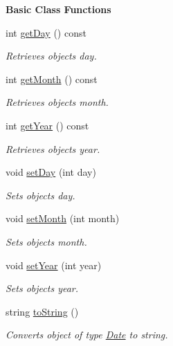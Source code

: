 \begin{Indent}\textbf{ Basic Class Functions}\par
\begin{DoxyCompactItemize}
\item 
int \hyperlink{group___date_ga0f253815240e70f4c39cb93cc68bd3f4}{get\+Day} () const
\begin{DoxyCompactList}\small\item\em Retrieves object\textquotesingle{}s day. \end{DoxyCompactList}\item 
int \hyperlink{group___date_ga332f6e3a2f6a40d73742b6dab7be0f64}{get\+Month} () const
\begin{DoxyCompactList}\small\item\em Retrieves object\textquotesingle{}s month. \end{DoxyCompactList}\item 
int \hyperlink{group___date_ga8b0869f34c2b38d108ab83ee2e770e5d}{get\+Year} () const
\begin{DoxyCompactList}\small\item\em Retrieves object\textquotesingle{}s year. \end{DoxyCompactList}\item 
void \hyperlink{group___date_ga2f97b9d1ac5ef0ef6b6cab3335c5303d}{set\+Day} (int day)
\begin{DoxyCompactList}\small\item\em Sets object\textquotesingle{}s day. \end{DoxyCompactList}\item 
void \hyperlink{group___date_ga23aa56014dd581d691607df5d4474f64}{set\+Month} (int month)
\begin{DoxyCompactList}\small\item\em Sets object\textquotesingle{}s month. \end{DoxyCompactList}\item 
void \hyperlink{group___date_ga895c4ae9868e43577cf59d9c679d7a71}{set\+Year} (int year)
\begin{DoxyCompactList}\small\item\em Sets object\textquotesingle{}s year. \end{DoxyCompactList}\item 
string \hyperlink{group___date_gadebdb45904dc2fbfacc66aa7528e0c04}{to\+String} ()
\begin{DoxyCompactList}\small\item\em Converts object of type \hyperlink{class_date}{Date} to string. \end{DoxyCompactList}\end{DoxyCompactItemize}
\end{Indent}
